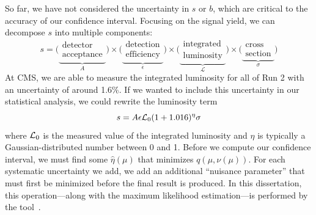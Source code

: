 So far, we have not considered the uncertainty in $s$ or $b$, which are critical to the accuracy of our confidence interval. 
Focusing on the signal yield, we can decompose $s$ into multiple components:
\begin{equation}
    s = \big(\underbrace{\substack{\text{detector} \\ \text{acceptance}}}_A\big)
        \times\big(\underbrace{\substack{\text{detection} \\ \text{efficiency}}}_\epsilon\big)
        \times\big(\underbrace{\substack{\text{integrated} \\ \text{luminosity}}}_\mathcal{L}\big)
        \times\big(\underbrace{\substack{\text{cross} \\ \text{section}}}_\sigma\big)
\end{equation}
At CMS, we are able to measure the integrated luminosity for all of Run 2 with an uncertainty of around 1.6\%. 
If we wanted to include this uncertainty in our statistical analysis, we could rewrite the luminosity term \Lumi
\begin{equation}
    s = A\epsilon\mathcal{L}_0(1 + 1.016)^\eta\sigma
\end{equation}
where $\mathcal{L}_0$ is the measured value of the integrated luminosity and $\eta$ is typically a Gaussian-distributed number between 0 and 1. 
Before we compute our confidence interval, we must find some $\hat{\eta}(\mu)$ that minimizes $q(\mu, \nu(\mu))$. 
For each systematic uncertainty we add, we add an additional ``nuisance parameter'' that must first be minimized before the final result is produced. 
In this dissertation, this operation---along with the maximum likelihood estimation---is performed by the \COMBINE tool~\cite{CombinePaper}. 
